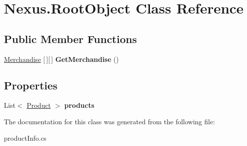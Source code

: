 \hypertarget{class_nexus_1_1_root_object}{}\section{Nexus.\+Root\+Object Class Reference}
\label{class_nexus_1_1_root_object}
\subsection*{Public Member Functions}
\begin{DoxyCompactItemize}
\item 
\mbox{\label{class_nexus_1_1_root_object_a9bc8a6124e7b3c2ca82c87c3e55f955e}} 
\mbox{\hyperlink{class_nexus_1_1_merchandise}{Merchandise}} \mbox{[}$\,$\mbox{]}\mbox{[}$\,$\mbox{]} {\bfseries Get\+Merchandise} ()
\end{DoxyCompactItemize}
\subsection*{Properties}
\begin{DoxyCompactItemize}
\item 
\mbox{\label{class_nexus_1_1_root_object_acc509e80f5c2f35c935afe346acdccc7}} 
List$<$ \mbox{\hyperlink{class_nexus_1_1_product}{Product}} $>$ {\bfseries products}
\end{DoxyCompactItemize}


The documentation for this class was generated from the following file\+:\begin{DoxyCompactItemize}
\item 
product\+Info.\+cs\end{DoxyCompactItemize}
